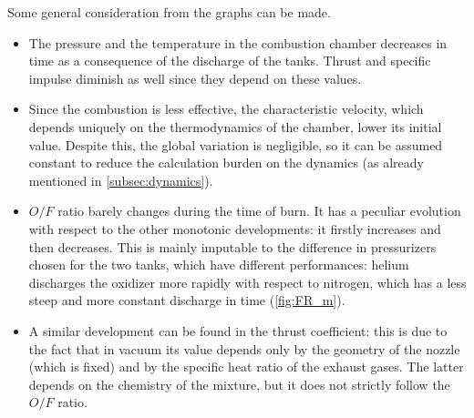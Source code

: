 
Some general consideration from the graphs can be made.
\begin{itemize}
    \item The pressure and the temperature in the combustion chamber decreases in time as a consequence of the discharge of the tanks. Thrust and specific impulse diminish as well since they depend on these values.
    \item Since the combustion is less effective, the characteristic velocity, which depends uniquely on the thermodynamics of the chamber, lower its initial value. Despite this, the global variation is negligible, so it can be assumed constant to reduce the calculation burden on the dynamics (as already mentioned in \autoref{subsec:dynamics}).
    \item $O/F$ ratio barely changes during the time of burn. It has a peculiar evolution with respect to the other monotonic developments: it firstly increases and then decreases. This is mainly imputable to the difference in pressurizers chosen for the two tanks, which have different performances: helium discharges the oxidizer more rapidly with respect to nitrogen, which has a less steep and more constant discharge in time (\autoref{fig:FR_m}).
    \item A similar development can be found in the thrust coefficient: this is due to the fact that in vacuum its value depends only by the geometry of the nozzle (which is fixed) and by the specific heat ratio of the exhaust gases. The latter depends on the chemistry of the mixture, but it does not strictly follow the $O/F$ ratio.
\end{itemize}